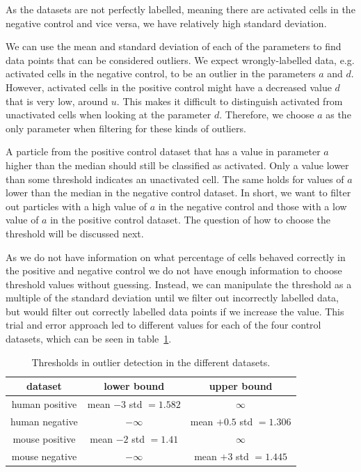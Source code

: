 As the datasets are not perfectly labelled, meaning there are activated cells in the negative control and vice versa, we have relatively high standard deviation.

We can use the mean and standard deviation of each of the parameters to find data points that can be considered outliers. We expect wrongly-labelled data, e.g. activated cells in the negative control, to be an outlier in the parameters $a$ and $d$. However, activated cells in the positive control might have a decreased value $d$ that is very low, around $u$. This makes it difficult to distinguish activated from unactivated cells when looking at the parameter $d$. Therefore, we choose $a$ as the only parameter when filtering for these kinds of outliers.

A particle from the positive control dataset that has a value in parameter $a$ higher than the median should still be classified as activated. Only a value lower than some threshold indicates an unactivated cell. The same holds for values of $a$ lower than the median in the negative control dataset. In short, we want to filter out particles with a high value of $a$ in the negative control and those with a low value of $a$ in the positive control dataset. The question of how to choose the threshold will be discussed next.

As we do not have information on what percentage of cells behaved correctly in the positive and negative control we do not have enough information to choose threshold values without guessing. Instead, we can manipulate the threshold as a multiple of the standard deviation until we filter out incorrectly labelled data, but would filter out correctly labelled data points if we increase the value. This trial and error approach led to different values for each of the four control datasets, which can be seen in table~\ref{tab:threshold_outlier}.

\begin{table}[h!]
	\centering
	\begin{tabular}{|c|c|c|}
		\hline
		dataset & lower bound & upper bound \\
		\hline
		human positive & mean $ - 3$ std $ = 1.582$ & $\infty$ \\
		\hline
		human negative & $-\infty$ & mean $ + 0.5$ std $ = 1.306$ \\
		\hline
		mouse positive & mean $ - 2$ std $ = 1.41$ & $\infty$ \\
		\hline
		mouse negative & $-\infty$ & mean $ + 3$ std $ = 1.445$ \\
		\hline
	\end{tabular}
	\label{tab:threshold_outlier}
	\caption{Thresholds in outlier detection in the different datasets.}
\end{table}


